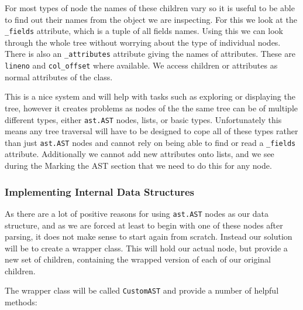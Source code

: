 \documentclass[twoside,a4paper]{report}
\begin{document}
For most types of node the names of these children vary so it is useful to be able to find out their names from the object we are inspecting. For this we
look at the \texttt{\_fields} attribute, which is a tuple of all fields names. Using this we can look through the whole tree without worrying about the type
of individual nodes. There is also an \texttt{\_attributes} attribute giving the names of attributes. These are \texttt{lineno} and \texttt{col\_offset} where
available. We access children or attributes as normal attributes of the class.

This is a nice system and will help with tasks such as exploring or displaying the tree, however it creates problems as nodes of the the same tree can be of
multiple different types, either \texttt{ast.AST} nodes, lists, or basic types. Unfortunately this means any tree traversal will have to be designed to
cope all of these types rather than just \texttt{ast.AST} nodes and cannot rely on being able to find or read a \texttt{\_fields} attribute. Additionally we
cannot add new attributes onto lists, and we see during the Marking the AST section that we need to do this for any node.

\subsubsection{Implementing Internal Data Structures}

As there are a lot of positive reasons for using \texttt{ast.AST} nodes as our data structure, and as we are forced at least to begin with one of these nodes after parsing,
it does not make sense to start again from scratch. Instead our solution will be to create a wrapper class. This will hold our actual node, but provide a new set of
children, containing the wrapped version of each of our original children.

The wrapper class will be called \texttt{CustomAST} and provide a number of helpful methods:
\end{document}
